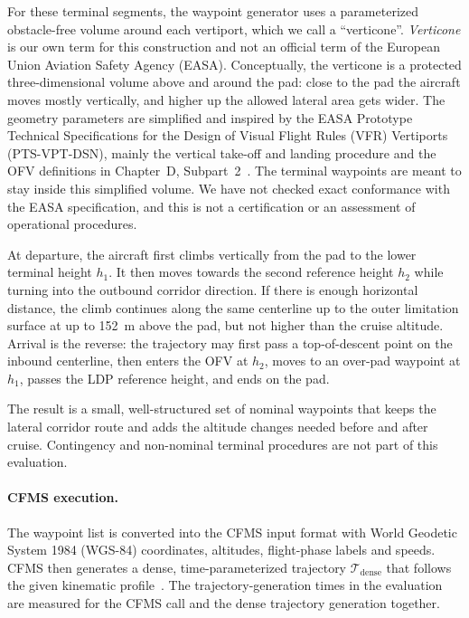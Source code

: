 For these terminal segments, the waypoint generator uses a parameterized obstacle-free volume around each vertiport, which we call a ``verticone''. \emph{Verticone} is our own term for this construction and not an official term of the European Union Aviation Safety Agency (EASA). Conceptually, the verticone is a protected three-dimensional volume above and around the pad: close to the pad the aircraft moves mostly vertically, and higher up the allowed lateral area gets wider. The geometry parameters are simplified and inspired by the EASA Prototype Technical Specifications for the Design of Visual Flight Rules (VFR) Vertiports (PTS-VPT-DSN), mainly the vertical take-off and landing procedure and the OFV definitions in Chapter~D, Subpart~2~\cite{easa2022_pts_vpt_dsn}. The terminal waypoints are meant to stay inside this simplified volume. We have not checked exact conformance with the EASA specification, and this is not a certification or an assessment of operational procedures.

At departure, the aircraft first climbs vertically from the pad to the lower terminal height \(h_1\). It then moves towards the second reference height \(h_2\) while turning into the outbound corridor direction. If there is enough horizontal distance, the climb continues along the same centerline up to the outer limitation surface at up to \SI{152}{m} above the pad, but not higher than the cruise altitude. Arrival is the reverse: the trajectory may first pass a top-of-descent point on the inbound centerline, then enters the OFV at \(h_2\), moves to an over-pad waypoint at \(h_1\), passes the LDP reference height, and ends on the pad.

The result is a small, well-structured set of nominal waypoints that keeps the lateral corridor route and adds the altitude changes needed before and after cruise. Contingency and non-nominal terminal procedures are not part of this evaluation.

\paragraph{CFMS execution.}
The waypoint list is converted into the CFMS input format with World Geodetic System 1984 (WGS-84) coordinates, altitudes, flight-phase labels and speeds. CFMS then generates a dense, time-parameterized trajectory \(\mathcal{T}_{\mathrm{dense}}\) that follows the given kinematic profile~\cite{morscheck2021cfms}. The trajectory-generation times in the evaluation are measured for the CFMS call and the dense trajectory generation together.

